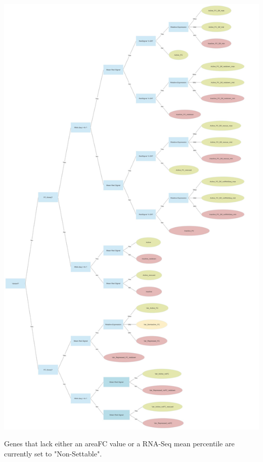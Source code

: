 \documentclass[11pt]{article}
\begin{document}
\begin{center}
\includegraphics[width=.9\linewidth]{./Plots/decision_tree.jpg}
\end{center}

Genes that lack either an areaFC value or a RNA-Seq mean percentile are currently set to "Non-Settable".
\end{document}
